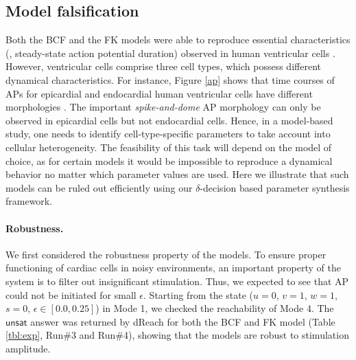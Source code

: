 \subsection{Model falsification}
Both the BCF and the FK models were able to reproduce essential characteristics (\eg, steady-state action potential duration) observed in human ventricular cells \cite{fenton98,orovio08}. However, ventricular cells comprise three cell types, which possess different dynamical characteristics. For instance, Figure \ref{ap} shows that time courses of APs for epicardial and endocardial human ventricular cells have different morphologies \cite{nabauer96}. The important \textit{spike-and-dome} AP morphology can only be observed in epicardial cells but not endocardial cells. Hence, in a model-based study, one needs to identify cell-type-specific parameters to take account into cellular heterogeneity. The feasibility of this task will depend on the model of choice, as for certain models it would be impossible to reproduce a dynamical behavior no matter which parameter values are used. Here we illustrate that such models can be ruled out efficiently using our $\delta$-decision based parameter synthesis framework.

\paragraph{Robustness.}
We first considered the robustness property of the models. To ensure proper functioning of cardiac cells in noisy environments, an important property of the system is to filter out insignificant stimulation. Thus, we expected to see that AP could not be initiated for small $\epsilon$. Starting from the state ($u = 0$, $v = 1$, $w = 1$, $s = 0$, $\epsilon \in [0.0,0.25]$) in Mode 1, we checked the reachability of Mode 4. The $\mathsf{unsat}$ answer was returned by dReach for both the BCF and FK
model (Table \ref{tbl:exp}, Run\#3 and Run\#4), showing that the models are robust to stimulation amplitude.



